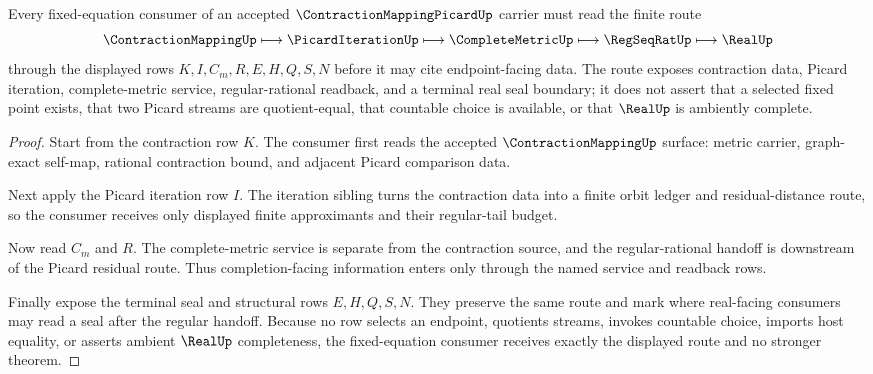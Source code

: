 \begin{theorem}
\label{thm:contraction-mapping-picard-fixed-equation-route}
Every fixed-equation consumer of an accepted $\ContractionMappingPicardUp$ carrier must read the finite route
$$
\ContractionMappingUp \longmapsto \PicardIterationUp \longmapsto \CompleteMetricUp \longmapsto \RegSeqRatUp \longmapsto \RealUp
$$
through the displayed rows $K,I,C_m,R,E,H,Q,S,N$ before it may cite endpoint-facing data. The route exposes contraction data, Picard iteration, complete-metric service, regular-rational readback, and a terminal real seal boundary; it does not assert that a selected fixed point exists, that two Picard streams are quotient-equal, that countable choice is available, or that $\RealUp$ is ambiently complete.
\end{theorem}
\begin{proof}
Start from the contraction row $K$. The consumer first reads the accepted $\ContractionMappingUp$ surface: metric carrier, graph-exact self-map, rational contraction bound, and adjacent Picard comparison data.

Next apply the Picard iteration row $I$. The iteration sibling turns the contraction data into a finite orbit ledger and residual-distance route, so the consumer receives only displayed finite approximants and their regular-tail budget.

Now read $C_m$ and $R$. The complete-metric service is separate from the contraction source, and the regular-rational handoff is downstream of the Picard residual route. Thus completion-facing information enters only through the named service and readback rows.

Finally expose the terminal seal and structural rows $E,H,Q,S,N$. They preserve the same route and mark where real-facing consumers may read a seal after the regular handoff. Because no row selects an endpoint, quotients streams, invokes countable choice, imports host equality, or asserts ambient $\RealUp$ completeness, the fixed-equation consumer receives exactly the displayed route and no stronger theorem.
\end{proof}


